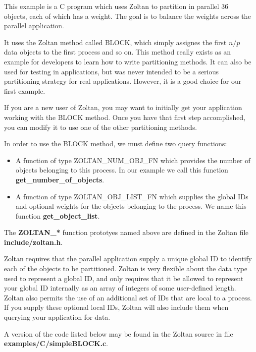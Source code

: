 This example is a C program which uses Zoltan to partition
in parallel 36 objects, each of which has a weight.  The goal is
to balance the weights across the parallel application.

It uses the Zoltan method called BLOCK, which simply assignes 
the first $n/p$ data objects to the first process and so on.
This method really exists as an example for developers
to learn how to write partitioning methods.  
It can also be used for testing in applications, but was never
intended to be a serious partitioning strategy for real applications.
However, it is a good choice for our first example.  

If you are a new user of Zoltan, you may want to initially get your
application working with the BLOCK method.  Once you have
that first step accomplished, you can modify it to use one of the
other partitioning methods.

In order to use the BLOCK method, we must define two query functions:

\begin{itemize}
\item A function of type ZOLTAN\_NUM\_OBJ\_FN which provides the number of objects belonging to this process.  In our example we call this function \textbf{get\_number\_of\_objects}.
\item A function of type ZOLTAN\_OBJ\_LIST\_FN which supplies the global IDs and optional weights for the objects belonging to the process.  We name this function \textbf{get\_object\_list}.
\end{itemize}

The \textbf{ZOLTAN\_*} function prototyes named above
are defined in the Zoltan file \textbf{include/zoltan.h}.

Zoltan requires that the parallel application supply a unique 
global ID to identify each of the objects to be partitioned.
Zoltan is very flexible about the data type used to represent
a global ID, and only requires that it be allowed to represent
your global ID internally as an array of integers of some user-defined
length.  Zoltan also permits the use of an additional set of
IDs that are local to a process.  If you supply these optional local IDs,
Zoltan will also include them when querying your application for data.

A version of the 
code listed below may be found in the Zoltan source in file
\textbf{examples/C/simpleBLOCK.c}. 

